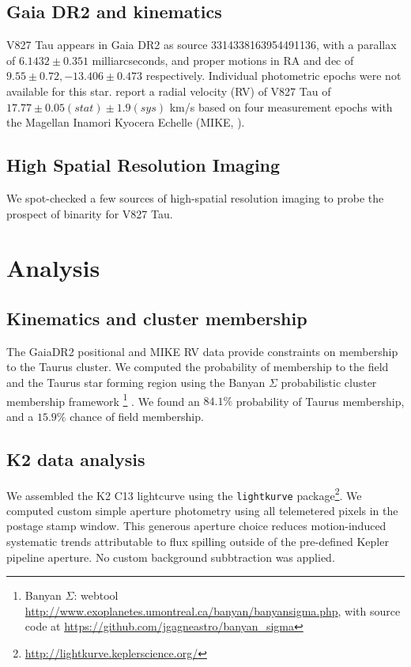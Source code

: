 \documentclass[revtex4]{emulateapj}%
\begin{document}
\subsection{Gaia DR2 and kinematics} \label{sec:GaiaDR2}

V827 Tau appears in Gaia DR2 \citep{2016A&A...595A...1G, 2018A&A...616A...1G} as source 3314338163954491136, with a parallax of $6.1432 \pm 0.351 $ milliarcseconds, and proper motions in RA and dec of $9.55 \pm 0.72, -13.406 \pm 0.473$ respectively. Individual photometric epochs were not available for this star. \citet{nguyen12} report a radial velocity (RV) of V827 Tau of $17.77 \pm 0.05 (stat) \pm 1.9 (sys) $ km/s based on four measurement epochs with the Magellan Inamori Kyocera Echelle (MIKE, \citet{2003SPIE.4841.1694B}).

\subsection{High Spatial Resolution Imaging} \label{sec:imaging}
We spot-checked a few sources of high-spatial resolution imaging to probe the prospect of binarity for V827 Tau.



\section{Analysis}\label{sec:Analysis}

\subsection{Kinematics and cluster membership}
The GaiaDR2 positional and MIKE RV data provide constraints on membership to the Taurus cluster.  We computed the probability of membership to the field and the Taurus star forming region using the Banyan $\Sigma$ probabilistic cluster membership framework \footnote{Banyan $\Sigma$: webtool \url{http://www.exoplanetes.umontreal.ca/banyan/banyansigma.php}, with source code at \url{https://github.com/jgagneastro/banyan_sigma}} \citep{2018ApJ...856...23G}.  We found an $84.1\%$ probability of Taurus membership, and a $15.9\%$ chance of field membership.

\subsection{K2 data analysis}
We assembled the K2 C13 lightcurve using the \texttt{lightkurve} package\footnote{\url{http://lightkurve.keplerscience.org/}}.  We computed custom simple aperture photometry using all telemetered pixels in the postage stamp window.  This generous aperture choice reduces motion-induced systematic trends attributable to flux spilling outside of the pre-defined Kepler pipeline aperture.  No custom background subbtraction was applied.
\end{document}
